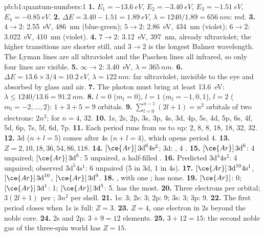 \begin{solution}{pb:b1:quantum-numbers:1}
\textbf{1.} $E_1 = \qty{-13.6}{eV}$, $E_2 = \qty{-3.40}{eV}$,
$E_3 = \qty{-1.51}{eV}$, $E_4 = \qty{-0.85}{eV}$.
\textbf{2.} $\Delta E = 3.40 - 1.51 = \qty{1.89}{eV}$, $\lambda = 1240/1.89
= \qty{656}{nm}$: red.
\textbf{3.} $4 \to 2$: \qty{2.55}{eV}, \qty{486}{nm} (blue-green);
$5 \to 2$: \qty{2.86}{eV}, \qty{434}{nm} (violet); $6 \to 2$: \qty{3.022}{eV},
\qty{410}{nm} (violet).
\textbf{4.} $7 \to 2$: \qty{3.12}{eV}, \qty{397}{nm}, already ultraviolet;
the higher transitions are shorter still, and $3 \to 2$ is the longest
Balmer wavelength. The Lyman lines are all ultraviolet and the Paschen
lines all infrared, so only four lines are visible.
\textbf{5.} $\infty \to 2$: \qty{3.40}{eV}, $\lambda = \qty{365}{nm}$.
\textbf{6.} $\Delta E = 13.6 \times 3/4 = \qty{10.2}{eV}$, $\lambda =
\qty{122}{nm}$: far ultraviolet, invisible to the eye and absorbed by
glass and air.
\textbf{7.} The photon must bring at least \qty{13.6}{eV}: $\lambda \le
1240/13.6 = \qty{91.2}{nm}$.
\textbf{8.} $l = 0$ ($m_l = 0$), $l = 1$ ($m_l = -1, 0, 1$), $l = 2$
($m_l = -2, \dots, 2$): $1 + 3 + 5 = 9$ orbitals.
\textbf{9.} $\sum_{l=0}^{n-1}(2l+1) = n^2$ orbitals of two electrons:
$2n^2$; for $n = 4$, 32.
\textbf{10.} 1s, 2s, 2p, 3s, 3p, 4s, 3d, 4p, 5s, 4d, 5p, 6s, 4f, 5d, 6p,
7s, 5f, 6d, 7p.
\textbf{11.} Each period runs from $n$s to $n$p: 2, 8, 8, 18, 18, 32, 32.
\textbf{12.} 3d ($n + l = 5$) comes after 4s ($n + l = 4$), which opens
period 4.
\textbf{13.} $Z = 2, 10, 18, 36, 54, 86, 118$.
\textbf{14.} $[\ce{Ar}]\,3\text{d}^6 4\text{s}^2$; 3d: ,
4 .
\textbf{15.}  $[\ce{Ar}]\,3\text{d}^6$: 4 unpaired;
 $[\ce{Ar}]\,3\text{d}^5$: 5 unpaired, a half-filled .
\textbf{16.} Predicted $3\text{d}^4 4\text{s}^2$: 4 unpaired; observed
$3\text{d}^5 4\text{s}^1$: 6 unpaired (5 in 3d, 1 in 4s).
\textbf{17.}  $[\ce{Ar}]\,3\text{d}^{10} 4\text{s}^1$, 
$[\ce{Ar}]\,3\text{d}^{10}$,  $[\ce{Ar}]\,3\text{d}^9$.
\textbf{18.} , with one ;  has none.
\textbf{19.}  $[\ce{Ar}]$: 0;  $[\ce{Ar}]\,3\text{d}^1$:
1;  $[\ce{Ar}]\,3\text{d}^5$: 5.  has the most.
\textbf{20.} Three electrons per orbital; $3(2l + 1)$ per ;
$3n^2$ per shell.
\textbf{21.} 1s: 3; 2s: 3; 2p: 9; 3s: 3; 3p: 9.
\textbf{22.} The first period closes when 1s is full: $Z = 3$.
\textbf{23.} $Z = 4$, one electron in 2s beyond the noble core.
\textbf{24.} 2s and 2p: $3 + 9 = 12$ elements.
\textbf{25.} $3 + 12 = 15$: the second noble gas of the three-spin world
has \textbf{$Z = 15$}.
\end{solution}
